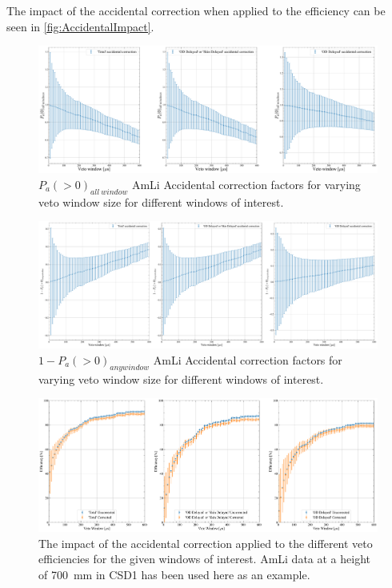 The impact of the accidental correction when applied to the efficiency can be seen in \autoref{fig:AccidentalImpact}.
\begin{figure}
	\centering
	\includegraphics[width=\textwidth]{figures/VetoEfficiency/SR3AmLi_700_Corrections_100k_P0.pdf}
	\caption{$P_a(>0)_{all\:window}$ AmLi Accidental correction factors for varying veto window size for different windows of interest.}
	\label{fig:AccCorr}
\end{figure}
\begin{figure}
	\centering
	\includegraphics[width=\textwidth]{figures/VetoEfficiency/SR3AmLi_700_Corrections_100k_P0-1.pdf}
	\caption{$1 - P_a(>0)_{any window}$ AmLi Accidental correction factors for varying veto window size for different windows of interest.}
	\label{fig:AccCorr_P0-1}
\end{figure}
\begin{figure}
	\centering
	\includegraphics[width=\textwidth]{figures/VetoEfficiency/AccidentalCorrectionImpact.pdf}
	\caption{The impact of the accidental correction applied to the different veto efficiencies for the given windows of interest. AmLi data at a height of 700~mm in CSD1 has been used here as an example.}
	\label{fig:AccidentalImpact}
\end{figure}


